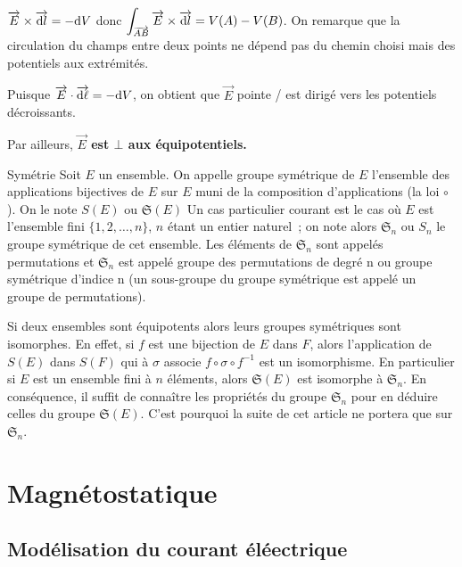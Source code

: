 \documentclass[a4paper,french,bookmarks]{book}
\newcommand{\chaptertoc}[0]{
    \setcounter{tocdepth}{2}
    \begin{tcolorbox}[
        enhanced,
        frame hidden,
        sharp corners,
        detach title,
        spread outwards     = 5pt,
        halign              = center,
        valign              = center,
        borderline west     = {3pt}{0pt}{main20!50!main2!95!gray!90},
        coltitle            = main20!50!main2!95!gray!90, 
        interior style      = {
            left color      = main1white2!65!gray!11,
            middle color    = main1white2!50!gray!10,
            right color     = main1white2!35!gray!9
        },
        arc                 = 0 cm,
        title               = SOMMAIRE,
        boxrule             = 0pt,
        fonttitle           = \bfseries\sffamily,
        overlay             = {
            \node[rotate=90, minimum width=1cm, anchor=south,yshift=-0.8cm]
            at (frame.west) {\tcbtitle};
        }
    ]
        \begin{minipage}{0.83\linewidth}
            \sffamily
            \minitoc
        \end{minipage}
    \end{tcolorbox}
}
\begin{document}
    $\overrightarrow{E}\times\overrightarrow{\mathrm d l} = -\mathrm d V$ donc $\displaystyle \int_{\overrightarrow{AB}}\overrightarrow{E}\times\overrightarrow{\mathrm d l} = V\!\left(A\right)-V\!\left(B\right)$. On remarque que la circulation du champs entre deux points ne dépend pas du chemin choisi mais des potentiels aux extrémités.
    \begin{property}{}{}
        Puisque $\overrightarrow{E} \cdot \overrightarrow{\mathrm d \ell} = -\mathrm d V$, on obtient que $\vec E$ pointe / est dirigé vers les potentiels décroissants.
        
        Par ailleurs, \bf{$\vec E$ est $\bot$ aux équipotentiels}.
    \end{property}

    \begin{definition}{Symétrie}{}
        Soit $E$ un ensemble. On appelle groupe symétrique de $E$ l'ensemble des applications bijectives de $E$ sur $E$ muni de la composition d'applications (la loi $\circ$). On le note $S(E)$ ou $ {\displaystyle {\mathfrak {S}}(E)}$
        Un cas particulier courant est le cas où $E$ est l'ensemble fini $\{1, 2, … , n\}$, $n$ étant un entier naturel ; on note alors $\mathfrak S_n$ ou $S_n$ le groupe symétrique de cet ensemble. Les éléments de $\mathfrak S_n$ sont appelés permutations et $\mathfrak S_n$ est appelé groupe des permutations de degré n ou groupe symétrique d'indice n (un sous-groupe du groupe symétrique est appelé un groupe de permutations).

Si deux ensembles sont équipotents alors leurs groupes symétriques sont isomorphes. En effet, si $f$ est une bijection de $E$ dans $F$, alors l'application de $S(E)$ dans $S(F)$ qui à $\sigma$ associe $f\circ\sigma\circ f^{−1}$ est un isomorphisme. En particulier si $E$ est un ensemble fini à $n$ éléments, alors ${\displaystyle {\mathfrak {S}}(E)}$ est isomorphe à $\mathfrak S_n$. En conséquence, il suffit de connaître les propriétés du groupe  $\mathfrak S_n$ pour en déduire celles du groupe ${\displaystyle {\mathfrak {S}}(E)}$. C'est pourquoi la suite de cet article ne portera que sur $\mathfrak S_n$. 
    \end{definition}
    
    \chapter{Magnétostatique}
    
    \chaptertoc
    
    \section{Modélisation du courant éléectrique}
    
\end{document}
